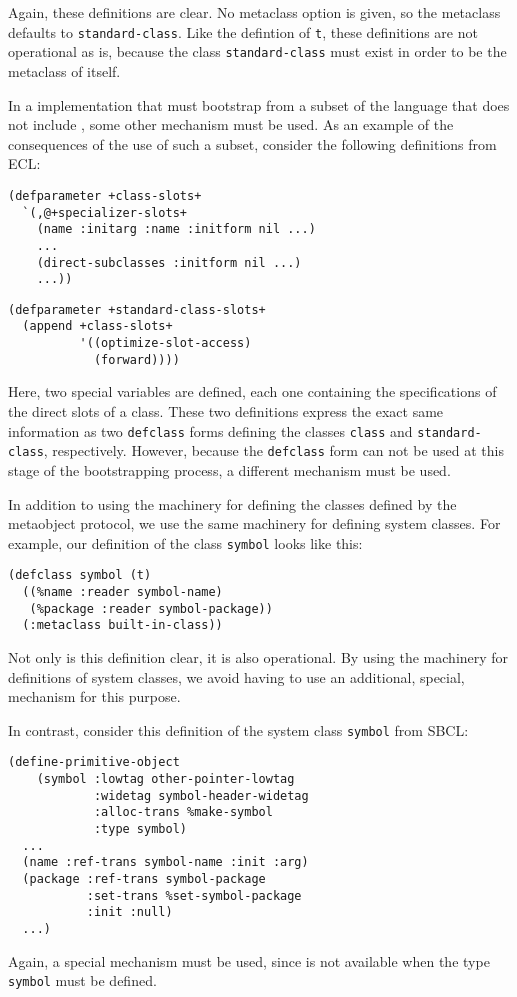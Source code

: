 \noindent
Again, these definitions are clear.  No metaclass option is given, so
the metaclass defaults to \texttt{standard-class}.  Like the defintion
of \texttt{t}, these definitions are not operational as is, because
the class \texttt{standard-class} must exist in order to be the
metaclass of itself.

In a \commonlisp{} implementation that must bootstrap \clos{} from a
subset of the language that does not include \clos{}, some other
mechanism must be used.  As an example of the consequences of the use
of such a subset, consider the following definitions from ECL:

\begin{verbatim}
(defparameter +class-slots+
  `(,@+specializer-slots+
    (name :initarg :name :initform nil ...)
    ...
    (direct-subclasses :initform nil ...)
    ...))
\end{verbatim}

\begin{verbatim}
(defparameter +standard-class-slots+
  (append +class-slots+
          '((optimize-slot-access)
            (forward))))
\end{verbatim}

\noindent
Here, two special variables are defined, each one containing the
specifications of the direct slots of a class.  These two definitions
express the exact same information as two \texttt{defclass} forms
defining the classes \texttt{class} and \texttt{standard-class},
respectively.  However, because the \texttt{defclass} form can not be
used at this stage of the bootstrapping process, a different mechanism
must be used.

In addition to using the \clos{} machinery for defining the classes
defined by the metaobject protocol, we use the same machinery for
defining system classes.  For example, our definition of the class
\texttt{symbol} looks like this:

\begin{verbatim}
(defclass symbol (t)
  ((%name :reader symbol-name)
   (%package :reader symbol-package))
  (:metaclass built-in-class))
\end{verbatim}

\noindent
Not only is this definition clear, it is also operational.  By using
the \clos{} machinery for definitions of system classes, we avoid
having to use an additional, special, mechanism for this purpose.

In contrast, consider this definition of the system class
\texttt{symbol} from SBCL:

\begin{verbatim}
(define-primitive-object
    (symbol :lowtag other-pointer-lowtag
            :widetag symbol-header-widetag
            :alloc-trans %make-symbol
            :type symbol)
  ...
  (name :ref-trans symbol-name :init :arg)
  (package :ref-trans symbol-package
           :set-trans %set-symbol-package
           :init :null)
  ...)
\end{verbatim}

\noindent
Again, a special mechanism must be used, since \clos{} is not
available when the type \texttt{symbol} must be defined.
